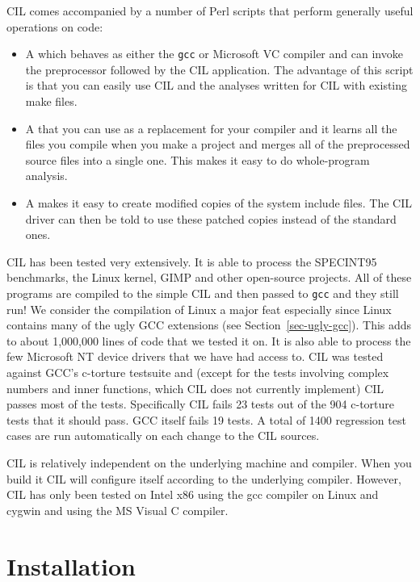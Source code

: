 \documentclass{article}
\def\secref#1{Section~\ref{sec-#1}}
\def\t#1{{\tt #1}}
\begin{document}
 CIL comes accompanied by a number of Perl scripts that perform generally
useful operations on code:
\begin{itemize}
\item A  which behaves as either the \t{gcc} or
Microsoft VC compiler and can invoke the preprocessor followed by the CIL
application. The advantage of this script is that you can easily use CIL and
the analyses written for CIL with existing make files.
\item A  that you can use as a
replacement for your compiler and it learns all the files you compile when you
make a project and merges all of the preprocessed source files into a single
one. This makes it easy to do whole-program analysis.
\item A  makes it easy to create modified
copies of the system include files. The CIL driver can then be told to use
these patched copies instead of the standard ones.
\end{itemize}

 CIL has been tested very extensively. It is able to process the SPECINT95
benchmarks, the Linux kernel, GIMP and other open-source projects. All of
these programs are compiled to the simple CIL and then passed to \t{gcc} and
they still run! We consider the compilation of Linux a major feat especially
since Linux contains many of the ugly GCC extensions (see \secref{ugly-gcc}).
This adds to about 1,000,000 lines of code that we tested it on. It is also
able to process the few Microsoft NT device drivers that we have had access
to. CIL was tested against GCC's c-torture testsuite and (except for the tests
involving complex numbers and inner functions, which CIL does not currently
implement) CIL passes most of the tests. Specifically CIL fails 23 tests out
of the 904 c-torture tests that it should pass. GCC itself fails 19 tests. A
total of 1400 regression test cases are run automatically on each change to
the CIL sources.

 CIL is relatively independent on the underlying machine and compiler. When
you build it CIL will configure itself according to the underlying compiler.
However, CIL has only been tested on Intel x86 using the gcc compiler on Linux
and cygwin and using the MS Visual C compiler. 

\section{Installation}
\end{document}
